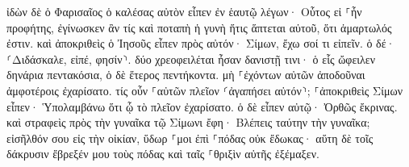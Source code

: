 \documentclass{openreader}
\begin{document}
ἰδὼν δὲ ὁ Φαρισαῖος ὁ καλέσας αὐτὸν εἶπεν ἐν ἑαυτῷ λέγων· Οὗτος εἰ ⸀ἦν προφήτης, ἐγίνωσκεν ἂν τίς καὶ ποταπὴ ἡ γυνὴ ἥτις ἅπτεται αὐτοῦ, ὅτι ἁμαρτωλός ἐστιν. 
καὶ ἀποκριθεὶς ὁ Ἰησοῦς εἶπεν πρὸς αὐτόν· Σίμων, ἔχω σοί τι εἰπεῖν. ὁ δέ· ⸂Διδάσκαλε, εἰπέ, φησίν⸃. 
δύο χρεοφειλέται ἦσαν δανιστῇ τινι· ὁ εἷς ὤφειλεν δηνάρια πεντακόσια, ὁ δὲ ἕτερος πεντήκοντα. 
μὴ ⸀ἐχόντων αὐτῶν ἀποδοῦναι ἀμφοτέροις ἐχαρίσατο. τίς οὖν ⸀αὐτῶν πλεῖον ⸂ἀγαπήσει αὐτόν⸃; 
⸀ἀποκριθεὶς Σίμων εἶπεν· Ὑπολαμβάνω ὅτι ᾧ τὸ πλεῖον ἐχαρίσατο. ὁ δὲ εἶπεν αὐτῷ· Ὀρθῶς ἔκρινας. 
καὶ στραφεὶς πρὸς τὴν γυναῖκα τῷ Σίμωνι ἔφη· Βλέπεις ταύτην τὴν γυναῖκα; εἰσῆλθόν σου εἰς τὴν οἰκίαν, ὕδωρ ⸀μοι ἐπὶ ⸀πόδας οὐκ ἔδωκας· αὕτη δὲ τοῖς δάκρυσιν ἔβρεξέν μου τοὺς πόδας καὶ ταῖς ⸀θριξὶν αὐτῆς ἐξέμαξεν. 
\end{document}
